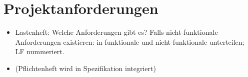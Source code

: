 \newpage
\section{Projektanforderungen}
\begin{itemize}
    \item Lastenheft: Welche Anforderungen gibt es? Falls nicht-funktionale Anforderungen existieren: in funktionale und nicht-funktionale unterteilen; LF nummeriert.
    \item (Pflichtenheft wird in Spezifikation integriert)
\end{itemize}